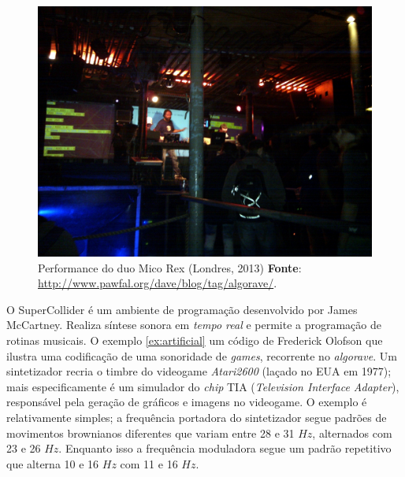 \begin{figure}[!h]
  \centering
  \includegraphics[scale=0.31]{imagens/algorave.jpg}
  \caption{Performance do duo Mico Rex (Londres, 2013) \textbf{Fonte}: \url{http://www.pawfal.org/dave/blog/tag/algorave/}.}
  \label{fig:micorex}
\end{figure}

O SuperCollider é um ambiente de programação desenvolvido por James McCartney. Realiza síntese sonora em \emph{tempo real} e permite a programação de rotinas musicais. O exemplo \autoref{ex:artificial} um código de Frederick Olofson que ilustra uma codificação de uma sonoridade de \emph{games}, recorrente no \emph{algorave}.  Um sintetizador recria o timbre do videogame \emph{Atari2600} (laçado no EUA em 1977); mais especificamente é um simulador do \emph{chip} TIA (\emph{Television Interface Adapter}), responsável pela geração de gráficos e imagens no videogame. O exemplo é relativamente simples; a frequência portadora do sintetizador segue padrões de movimentos brownianos diferentes que variam entre 28 e 31 $Hz$, alternados com 23 e 26 $Hz$. Enquanto isso a frequência moduladora segue um padrão repetitivo que alterna 10 e 16 $Hz$ com 11 e 16 $Hz$.

